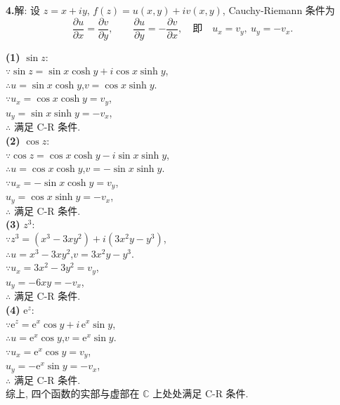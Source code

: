 \documentclass{article}
\begin{document}
\noindent
\begin{minipage}[t]{0.66\textwidth}
	
	\textbf{4.}\quad 解: 设 $z=x+iy$, $f(z)=u(x,y)+iv(x,y)$, Cauchy-Riemann 条件为
	\[
	\frac{\partial u}{\partial x}=\frac{\partial v}{\partial y},\qquad
	\frac{\partial u}{\partial y}=-\frac{\partial v}{\partial x},
	\quad\text{即}\quad u_x=v_y,\ u_y=-v_x.
	\]
	
	\textbf{(1)} $\sin z$:\\
	$\because \sin z=\sin x\cosh y+i\cos x\sinh y$,\\
	$\therefore u=\sin x\cosh y$,\quad $v=\cos x\sinh y$.\\
	$\because u_x=\cos x\cosh y=v_y$,\\
	\quad $u_y=\sin x\sinh y=-v_x$,\\
	$\therefore$ 满足 C-R 条件.\\[4pt]
	
	\textbf{(2)} $\cos z$:\\
	$\because \cos z=\cos x\cosh y-i\sin x\sinh y$,\\
	$\therefore u=\cos x\cosh y$,\quad $v=-\sin x\sinh y$.\\
	$\because u_x=-\sin x\cosh y=v_y$,\\
	\quad $u_y=\cos x\sinh y=-v_x$,\\
	$\therefore$ 满足 C-R 条件.\\[4pt]
	
	\textbf{(3)} $z^3$:\\
	$\because z^3=(x^3-3xy^2)+i(3x^2y-y^3)$,\\
	$\therefore u=x^3-3xy^2$,\quad $v=3x^2y-y^3$.\\
	$\because u_x=3x^2-3y^2=v_y$,\\
	\quad $u_y=-6xy=-v_x$,\\
	$\therefore$ 满足 C-R 条件.\\[4pt]
	
	\textbf{(4)} $\mathrm{e}^z$:\\
	$\because \mathrm{e}^z=\mathrm{e}^x\cos y+i\,\mathrm{e}^x\sin y$,\\
	$\therefore u=\mathrm{e}^x\cos y$,\quad $v=\mathrm{e}^x\sin y$.\\
	$\because u_x=\mathrm{e}^x\cos y=v_y$,\\
	\quad $u_y=-\mathrm{e}^x\sin y=-v_x$,\\
	$\therefore$ 满足 C-R 条件.\\[4pt]
	
	综上, 四个函数的实部与虚部在 $\mathbb{C}$ 上处处满足 C-R 条件.
	
\end{minipage}
\end{document}
